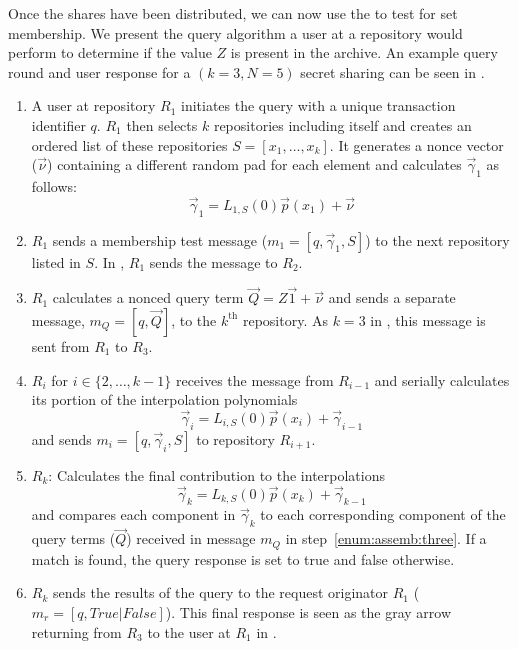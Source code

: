 Once the shares have been distributed, we can now use the \SIF to
test for set membership. We present
the query algorithm a user at a repository would perform to determine if
the value $Z$ is present in the archive.  An example query round and 
user response for a $(k=3,N=5)$ secret sharing can be seen in 
.

\begin{enumerate}
\item\label{enum:assemb:one} A user at repository $R_1$ initiates the
  query with a unique transaction identifier $q$.   $R_1$ then
  selects $k$ repositories including itself and creates an ordered list of these
  repositories $S = [x_1, \dots, x_k]$.  It generates a nonce
  vector ($\vec{\nu}$) containing a different random pad for each element
	and calculates $\vec{\gamma}_1$ as
  follows: \[ \vec{\gamma}_1 = L_{1, S}(0) \vec{p}(x_1) + \vec{\nu} \]

\item\label{enum:assemb:two}  $R_1$ sends a membership test
  message ($m_1 = [q, \vec{\gamma}_1, S]$) to the next repository listed in $S$.
	In , $R_1$ sends the message to $R_2$.
	

\item\label{enum:assemb:three}  $R_1$ calculates a nonced query
  term $\vec{Q}=Z\vec{1}+\vec{\nu}$ and sends a separate message, $m_Q = [q,\vec{Q}]$, to the $k^{\text{th}}$ repository.
	As $k=3$ in , this message is sent from $R_1$ to $R_3$.






\item\label{enum:assemb:five}  $R_i$ for $i\in\{2, \ldots, k-1\}$ receives the message from $R_{i-1}$ and
   serially calculates its portion of  the interpolation
   polynomials
   \begin{equation*}
        \label{eqn:gammai}
                 \vec{\gamma}_i =  L_{i, S}(0) \vec{p}(x_i) + \vec{\gamma}_{i-1}
   \end{equation*}
   and sends $m_i=[q, \vec{\gamma}_i, S]$ to repository $R_{i+1}$.

\item\label{enum:assemb:six}  $R_k$: Calculates the final
  contribution to the interpolations
  \begin{equation*}
    \label{eqn:gammak}
    \vec{\gamma}_k = L_{k,S}(0)   \vec{p}(x_k) + \vec{\gamma}_{k-1}
  \end{equation*}
  and compares each component in $\vec{\gamma}_k$ to each corresponding
  component of the query terms ($\vec{Q}$) received in message $m_Q$ in step~\ref{enum:assemb:three}. 
	If a match is found, the query response is set to true and false otherwise.

\item\label{enum:assemb:seven}  $R_k$ sends the results of the query to the 
	request originator $R_1$ ($m_r=[q,True|False]$). This final response is 
	seen as the gray arrow returning from $R_3$ to the user at $R_1$ in .
\end{enumerate}

